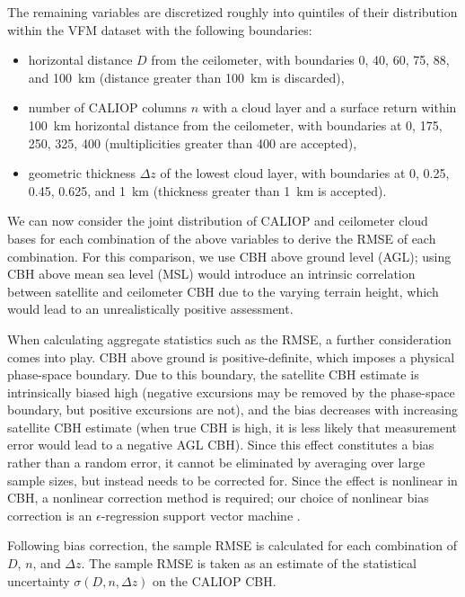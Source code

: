 \documentclass[essd,manuscript]{copernicus}\usepackage[]{graphicx}\usepackage[]{color}
\begin{document}
The remaining variables are discretized roughly into quintiles of their
distribution within the VFM dataset with the
following boundaries:
\begin{itemize}
\item horizontal distance $D$ from the ceilometer, with boundaries 0, 40, 60,
  75, 88, and 100~km (distance greater than 100~km is discarded),
\item number of CALIOP columns $n$ with a cloud layer and a surface return
  within 100~km horizontal distance from the ceilometer, with boundaries at 0,
  175, 250, 325, 400 (multiplicities greater than 400 are accepted),
\item geometric thickness $\Delta z$ of the lowest cloud layer, with boundaries
  at 0, 0.25, 0.45, 0.625, and 1~km (thickness greater than 1~km is accepted).
\end{itemize}

We can now consider the joint distribution of CALIOP and ceilometer cloud bases
for each combination of the above variables to derive the RMSE of each
combination.  For this comparison, we use CBH above ground level (AGL); using
CBH above mean sea level (MSL) would introduce an intrinsic correlation between
satellite and ceilometer CBH due to the varying terrain height, which would lead
to an unrealistically positive assessment.

When calculating aggregate statistics such as the RMSE, a further consideration
comes into play.  CBH above ground is positive-definite, which imposes a
physical phase-space boundary.  Due to this boundary, the satellite CBH estimate
is intrinsically biased high (negative excursions may be removed by the
phase-space boundary, but positive excursions are not), and the bias decreases
with increasing satellite CBH estimate (when true CBH is high, it is less likely
that measurement error would lead to a negative AGL CBH).  Since this effect
constitutes a bias rather than a random error, it cannot be eliminated by
averaging over large sample sizes, but instead needs to be corrected for.  Since
the effect is nonlinear in CBH, a nonlinear correction method is required; our
choice of nonlinear bias correction is an $\epsilon$-regression support vector
machine \citep[SVM,][]{svm}.

Following bias correction, the sample RMSE is calculated for each combination of
$D$, $n$, and $\Delta z$.  The sample RMSE is taken as an estimate of the
statistical uncertainty $\sigma(D,n,\Delta z)$ on the CALIOP CBH.
\end{document}
